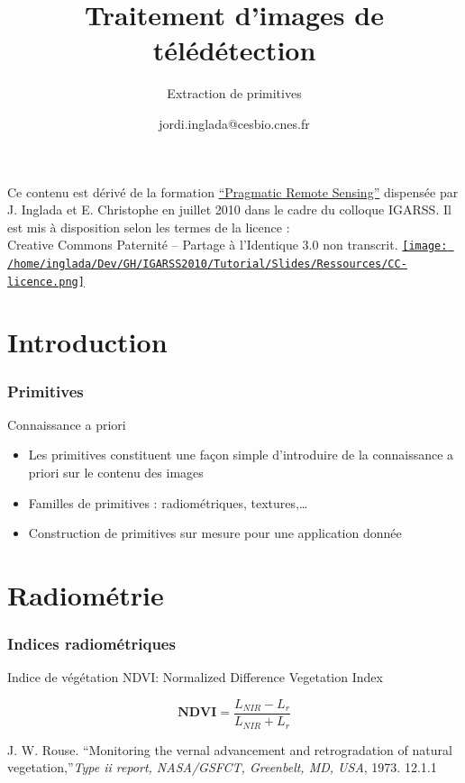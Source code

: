 \documentclass[compress]{beamer}
\title{Traitement d'images de télédétection}
\subtitle{Extraction de primitives}
\author
{jordi.inglada@cesbio.cnes.fr}
\institute[Cesbio] %
{\textsc{Centre d'Études Spatiales de la Biosphère, Toulouse, France}}
\date{}
\begin{document}
\begin{frame}
  \titlepage
  \begin{center}
{\tiny Ce contenu est dérivé de la formation \href{http://www.orfeo-toolbox.org/packages/PragmaticRemoteSensing-handout.pdf}{``Pragmatic Remote
  Sensing''} dispensée par J. Inglada et E. Christophe en juillet 2010
  dans le cadre du colloque IGARSS. Il est mis à disposition selon les termes de la licence :\\
Creative Commons Paternité – Partage à l’Identique 3.0 non transcrit.} \href{http://creativecommons.org/licenses/by-sa/3.0/}{\texttt{[image: /home/inglada/Dev/GH/IGARSS2010/Tutorial/Slides/Ressources/CC-licence.png]}}    
  \end{center}
\end{frame}

\section{Introduction}

\begin{frame}
\frametitle{Primitives}

\begin{block}{Connaissance a priori}
\begin{itemize}
\item Les primitives constituent une façon simple d'introduire de la
  connaissance a priori sur le contenu des images
\item Familles de primitives : radiométriques, textures,\ldots
\item Construction de primitives sur mesure pour une application donnée
\end{itemize}
\end{block}

\end{frame}

\section{Radiométrie}

\begin{frame}
\frametitle{Indices radiométriques}
Indice de végétation NDVI: Normalized Difference Vegetation Index \cite{Rouse1973-NDVI}

\begin{equation}
 \mathbf{NDVI} = \frac{L_{NIR}-L_{r}}{L_{NIR}+L_{r}}
 \end{equation}

\begin{thebibliography}{noidea}
\footnotesize
{}
J. W. Rouse. ``Monitoring the vernal advancement and retrogradation of natural vegetation,''{\em Type ii report, NASA/GSFCT, Greenbelt, MD, USA}, 1973. 12.1.1
\end{thebibliography}

\end{frame}
\end{document}
